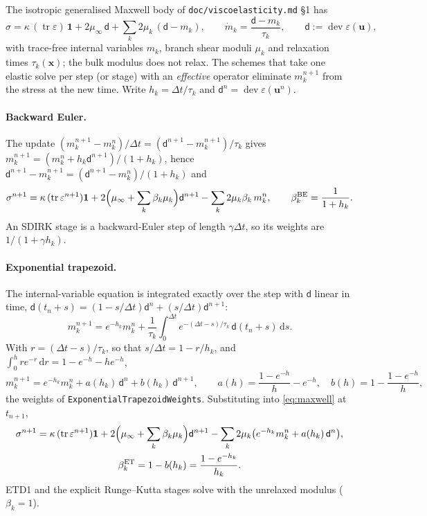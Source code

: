 \documentclass[11pt]{article}
\numberwithin{equation}{section}
\theoremstyle{remark}
\newcommand{\eps}{\varepsilon}
\newcommand{\tr}{\operatorname{tr}}
\newcommand{\dev}{\operatorname{dev}}
\newcommand{\vu}{\mathbf{u}}
\newcommand{\vx}{\mathbf{x}}
\newcommand{\one}{\mathbf{1}}
\newcommand{\code}[1]{\texttt{#1}}
\begin{document}
The isotropic generalised Maxwell body of \code{doc/viscoelasticity.md}
\S1 has
\begin{equation}
  \sigma = \kappa\,(\tr\eps)\,\one + 2\mu_\infty\,\mathsf d
           + \sum_k 2\mu_k\,(\mathsf d - m_k),
  \qquad
  \dot m_k = \frac{\mathsf d - m_k}{\tau_k},
  \qquad \mathsf d := \dev\eps(\vu),
  \label{eq:maxwell}
\end{equation}
with trace-free internal variables $m_k$, branch shear moduli $\mu_k$ and
relaxation times $\tau_k(\vx)$; the bulk modulus does not relax. The
schemes that take one elastic solve per step (or stage) with an
\emph{effective} operator eliminate $m_k^{n+1}$ from the stress at the new
time. Write $h_k = \Delta t/\tau_k$ and $\mathsf d^n = \dev\eps(\vu^n)$.

\paragraph{Backward Euler.} The update $(m_k^{n+1} - m_k^n)/\Delta t =
(\mathsf d^{n+1} - m_k^{n+1})/\tau_k$ gives $m_k^{n+1} = (m_k^n + h_k
\mathsf d^{n+1})/(1+h_k)$, hence $\mathsf d^{n+1} - m_k^{n+1} =
(\mathsf d^{n+1} - m_k^n)/(1+h_k)$ and
\begin{equation}
  \sigma^{n+1} = \kappa\,(\tr\eps^{n+1})\one
   + 2\Bigl(\mu_\infty + \sum_k \beta_k \mu_k\Bigr)\mathsf d^{n+1}
   - \sum_k 2\mu_k \beta_k\, m_k^n,
  \qquad
  \beta_k^{\mathrm{BE}} = \frac{1}{1+h_k}.
  \label{eq:beta-be}
\end{equation}
An SDIRK stage is a backward-Euler step of length $\gamma\Delta t$, so its
weights are $1/(1+\gamma h_k)$.

\paragraph{Exponential trapezoid.} The internal-variable equation is
integrated exactly over the step with $\mathsf d$ linear in time,
$\mathsf d(t_n + s) = (1 - s/\Delta t)\mathsf d^n + (s/\Delta t)\mathsf
d^{n+1}$:
\[
  m_k^{n+1} = e^{-h_k} m_k^n
   + \frac{1}{\tau_k}\int_0^{\Delta t} e^{-(\Delta t - s)/\tau_k}\,
     \mathsf d(t_n + s)\,\mathrm{d}s .
\]
With $r = (\Delta t - s)/\tau_k$, so that $s/\Delta t = 1 - r/h_k$, and
$\int_0^h r e^{-r}\,\mathrm dr = 1 - e^{-h} - h e^{-h}$,
\[
  m_k^{n+1} = e^{-h_k} m_k^n + a(h_k)\,\mathsf d^n + b(h_k)\,\mathsf d^{n+1},
  \qquad
  a(h) = \frac{1 - e^{-h}}{h} - e^{-h},
  \quad
  b(h) = 1 - \frac{1 - e^{-h}}{h},
\]
the weights of \code{ExponentialTrapezoidWeights}. Substituting into
\eqref{eq:maxwell} at $t_{n+1}$,
\begin{equation}
\begin{gathered}
  \sigma^{n+1} = \kappa\,(\tr\eps^{n+1})\one
   + 2\Bigl(\mu_\infty + \sum_k \beta_k \mu_k\Bigr)\mathsf d^{n+1}
   - \sum_k 2\mu_k \bigl(e^{-h_k} m_k^n + a(h_k)\,\mathsf d^n\bigr),
  \\
  \beta_k^{\mathrm{ET}} = 1 - b(h_k) = \frac{1 - e^{-h_k}}{h_k}.
\end{gathered}
  \label{eq:beta-et}
\end{equation}
ETD1 and the explicit Runge--Kutta stages solve with the unrelaxed
modulus ($\beta_k = 1$).
\end{document}
